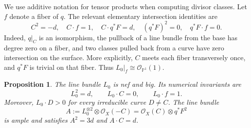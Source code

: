\documentclass[11pt,a4paper]{article}
\numberwithin{equation}{section}
\newtheorem{proposition}[theorem]{Proposition}
\theoremstyle{definition}
\theoremstyle{remark}
\renewcommand{\P}{\mathbb P}
\newcommand{\OO}{\mathcal O}
\begin{document}
We use additive notation for tensor products when computing divisor
classes.  Let $f$ denote a fiber of $q$.  The relevant elementary
intersection identities are
\begin{equation}\label{geo:intersection-table}
  C^2=-d,\quad C\cdot f=1,\quad
  C\cdot q^*F=d,\quad (q^*F)^2=0,\quad q^*F\cdot f=0.
\end{equation}
Indeed, $q|_C$ is an isomorphism, the pullback of a line bundle from
the base has degree zero on a fiber, and two classes pulled back from
a curve have zero intersection on the surface.
More explicitly, $C$ meets each fiber transversely once, and
$q^*F$ is trivial on that fiber. Thus
$L_0|_f\cong\OO_{\P^1}(1)$.

\begin{proposition}\label{geo:nef-big-ample}
The line bundle $L_0$ is nef and big.  Its numerical invariants are
\[
  L_0^2=d,\qquad L_0\cdot C=0,\qquad L_0\cdot f=1.
\]
Moreover, $L_0\cdot D>0$ for every irreducible curve $D\ne C$.
The line bundle
\begin{equation}\label{geo:A-definition}
  A:=L_0^{\otimes2}\otimes\OO_X(-C)
    =\OO_X(C)\otimes q^*F^2
\end{equation}
is ample and satisfies $A^2=3d$ and $A\cdot C=d$.
\end{proposition}
\end{document}

